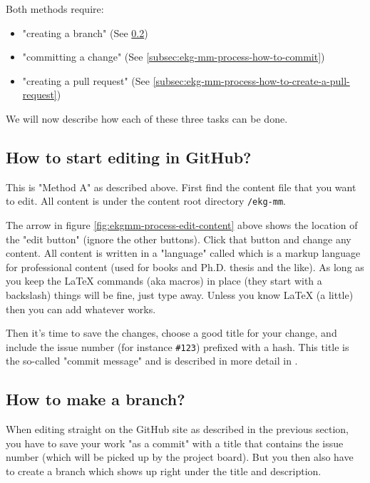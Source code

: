 Both methods require:

\begin{itemize}
    \item "creating a branch" (See \ref{subsec:ekg-mm-process-how-to-make-a-branch})
    \item "committing a change" (See \ref{subsec:ekg-mm-process-how-to-commit})
    \item "creating a pull request" (See \ref{subsec:ekg-mm-process-how-to-create-a-pull-request})
\end{itemize}

We will now describe how each of these three tasks can be done.

\subsection{How to start editing in GitHub?}

This is "Method A" as described above.
First find the content file that you want to edit.
All content is under the content root directory \texttt{/ekg-mm}.

The arrow in figure \ref{fig:ekgmm-process-edit-content} above shows the
location of the "edit button" (ignore the other buttons). 
Click that button and change any content. 
All content is written in a "language" called  which is
a markup language for professional content (used for books and Ph.D. 
thesis and the like).
As long as you keep the LaTeX commands (aka macros) in place (they 
start with a backslash) things will be fine, just type away. 
Unless you know LaTeX (a little) then you can add whatever works.

Then it’s time to save the changes, choose a good title for your 
change, and include the issue number (for instance \texttt{\#123})
prefixed with a hash.
This title is the so-called "commit message" and is described in 
more detail in .

\subsection{How to make a branch?}
\label{subsec:ekg-mm-process-how-to-make-a-branch}

When editing straight on the GitHub site as described in the previous 
section, you have to save your work "as a commit" with a title that 
contains the issue number (which will be picked up by the project board). 
But you then also have to create a branch which shows up right under 
the title and description. 

